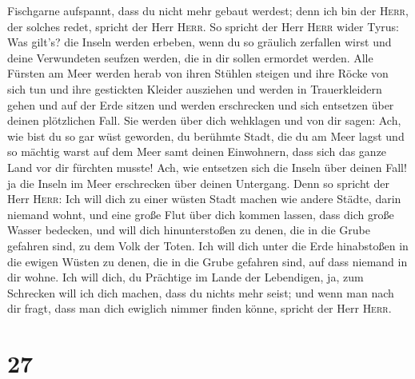 Fischgarne aufspannt, dass du nicht mehr gebaut werdest; denn ich bin
der \textsc{Herr}, der solches redet, spricht der Herr \textsc{Herr}.
 So spricht der Herr \textsc{Herr} wider Tyrus: Was
gilt's? die Inseln werden erbeben, wenn du so gräulich zerfallen wirst
und deine Verwundeten seufzen werden, die in dir sollen ermordet werden.
 Alle Fürsten am Meer werden herab von ihren Stühlen
steigen und ihre Röcke von sich tun und ihre gestickten Kleider
ausziehen und werden in Trauerkleidern gehen und auf der Erde sitzen und
werden erschrecken und sich entsetzen über deinen plötzlichen Fall.
 Sie werden über dich wehklagen und von dir sagen: Ach,
wie bist du so gar wüst geworden, du berühmte Stadt, die du am Meer
lagst und so mächtig warst auf dem Meer samt deinen Einwohnern, dass
sich das ganze Land vor dir fürchten musste!  Ach, wie
entsetzen sich die Inseln über deinen Fall! ja die Inseln im Meer
erschrecken über deinen Untergang.  Denn so spricht der
Herr \textsc{Herr}: Ich will dich zu einer wüsten Stadt machen wie
andere Städte, darin niemand wohnt, und eine große Flut über dich kommen
lassen, dass dich große Wasser bedecken,  und will dich
hinunterstoßen zu denen, die in die Grube gefahren sind, zu dem Volk der
Toten. Ich will dich unter die Erde hinabstoßen in die ewigen Wüsten zu
denen, die in die Grube gefahren sind, auf dass niemand in dir wohne.
Ich will dich, du Prächtige im Lande der Lebendigen,  ja,
zum Schrecken will ich dich machen, dass du nichts mehr seist; und wenn
man nach dir fragt, dass man dich ewiglich nimmer finden könne, spricht
der Herr \textsc{Herr}.

\hypertarget{section-26}{%
\section{27}\label{section-26}}

